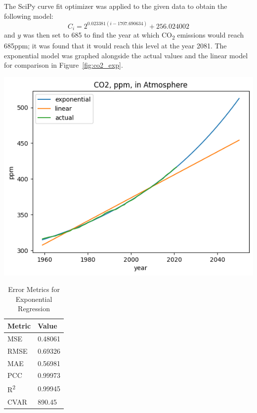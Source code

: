 \documentclass{mcmthesis}
\begin{document}
    The SciPy curve fit optimizer was applied to the given data to obtain the following model:
%
    \begin{equation}
        C_i = 2^{0.023381 (i - 1707.690634)} + 256.024002
        \label{eq:co2_exp}
    \end{equation}
%
    and $y$ was then set to 685 to find the year at which CO\textsubscript{2} emissions would reach 685ppm; it was found that it would reach this level at the year 2081.
    The exponential model was graphed alongside the actual values and the linear model for comparison in Figure~\ref{fig:co2_exp}.

    \begin{table}[h]
        \begin{minipage}{0.7\linewidth}
            \centering
            \includegraphics[width=\textwidth]{exponential}%
            \label{fig:co2_exp}
        \end{minipage}%
        \begin{minipage}{0.3\linewidth}
            \centering
            \begin{tabular}{ll}
                \toprule
                Metric               & Value   \\
                \midrule
                MSE                  & 0.48061 \\
                RMSE                 & 0.69326 \\
                MAE                  & 0.56981 \\
                PCC                  & 0.99973 \\
                R\textsuperscript{2} & 0.99945 \\
                CVAR                 & 890.45  \\
                \bottomrule
            \end{tabular}
            \vspace{8pt}
            \caption{Error Metrics for Exponential Regression}
            \label{tab:co2_exp_err}
        \end{minipage}
    \end{table}
\end{document}
